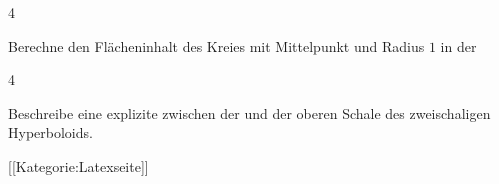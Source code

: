 {4}
{

Berechne den Flächeninhalt des Kreies mit Mittelpunkt
 und Radius $1$ in der

}
{} {}

{4}
{

Beschreibe eine explizite
zwischen der
und der oberen Schale des zweischaligen Hyperboloids.

}
{} {}

 [[Kategorie:Latexseite]]
